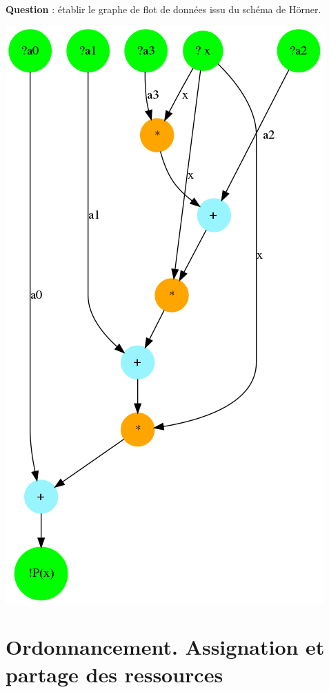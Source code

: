 \documentclass[a4paper,11pt]{exam}
\begin{document}
\begin{questions}
  \question \textbf{Question} : établir le graphe de flot de données issu du schéma de Hörner.
  \begin{solution}
      \begin{center}
        \includegraphics[scale=0.5]{dfg_horner.png}
      \end{center}
  \end{solution}
\end{questions}

\section{Ordonnancement. Assignation et partage des ressources}
\end{document}
